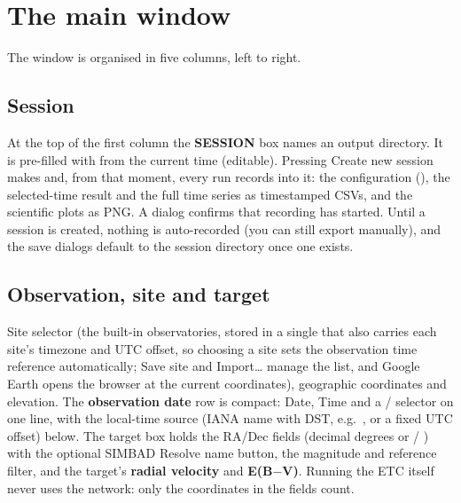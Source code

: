 \section{The main window}

The window is organised in five columns, left to right.

\subsection{Session}
\label{sec:session}

At the top of the first column the \textbf{SESSION} box names an output
directory. It is pre-filled with  from the
current time (editable). Pressing \textsf{Create new session} makes
 and, from that moment, every run records into
it: the configuration (), the selected-time result and the
full time series as timestamped CSVs, and the scientific plots as PNG. A
dialog confirms that recording has started. Until a session is created,
nothing is auto-recorded (you can still export manually), and the save
dialogs default to the session directory once one exists.

\subsection{Observation, site and target}
\label{sec:obs-site-target}

Site selector (the built-in observatories, stored in a single
 that also carries each site's timezone and UTC
offset, so choosing a site sets the observation time reference
automatically; \textsf{Save site} and \textsf{Import\ldots} manage the
list, and \textsf{Google Earth} opens the browser at the current
coordinates), geographic coordinates and elevation. The
\textbf{observation date} row is compact: \textsf{Date}, \textsf{Time} and
a / selector on one line, with the local-time source
(IANA name with DST, e.g.\ , or a fixed UTC offset)
below. The target box holds the RA/Dec fields (decimal degrees or
 / ) with the optional SIMBAD \textsf{Resolve
name} button, the magnitude and reference filter, and the target's
\textbf{radial velocity} and \textbf{E(B$-$V)}. Running the ETC itself
never uses the network: only the coordinates in the fields count.

